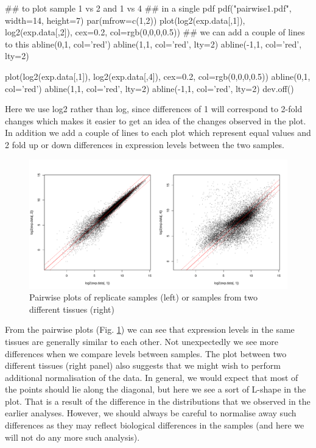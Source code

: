 \documentclass[11pt]{article}
\begin{document}
\begin{rcode}
  ## to plot sample 1 vs 2 and 1 vs 4
  ## in a single pdf 
  pdf("pairwise1.pdf", width=14, height=7)
  par(mfrow=c(1,2))
  plot(log2(exp.data[,1]), log2(exp.data[,2]), cex=0.2, col=rgb(0,0,0,0.5))
  ## we can add a couple of lines to this
  abline(0,1, col='red')
  abline(1,1, col='red', lty=2)
  abline(-1,1, col='red', lty=2)

  plot(log2(exp.data[,1]), log2(exp.data[,4]), cex=0.2, col=rgb(0,0,0,0.5))
  abline(0,1, col='red')
  abline(1,1, col='red', lty=2)
  abline(-1,1, col='red', lty=2)
  dev.off()
\end{rcode}

Here we use log2 rather than log, since differences of 1 will correspond to
2-fold changes which makes it easier to get an idea of the changes
observed in the plot. In addition we add a couple of lines to each plot
which represent equal values and 2 fold up or down differences in expression
levels between the two samples.

\begin{figure}[ht]
  \includegraphics[width=\textwidth]{images/pairwise1}
  \caption{Pairwise plots of replicate samples (left) or samples
    from two different tissues (right)}
  \label{pairwise}
\end{figure}

From the pairwise plots (Fig. \ref{pairwise}) we can see that expression levels
in the same tissues are generally similar to each other. Not 
unexpectedly we see more differences when we compare levels between samples.
The plot between two different tissues (right panel) also suggests that we
might wish to perform additional normalisation of the data. In general, we
would expect that most of the points should lie along the diagonal, but here we
see a sort of L-shape in the plot. That is a result of the difference in the
distributions that we observed in the earlier analyses. However, we should
always be careful to normalise away such differences as they may reflect
biological differences in the samples (and here we will not do any more such
analysis).
\end{document}
